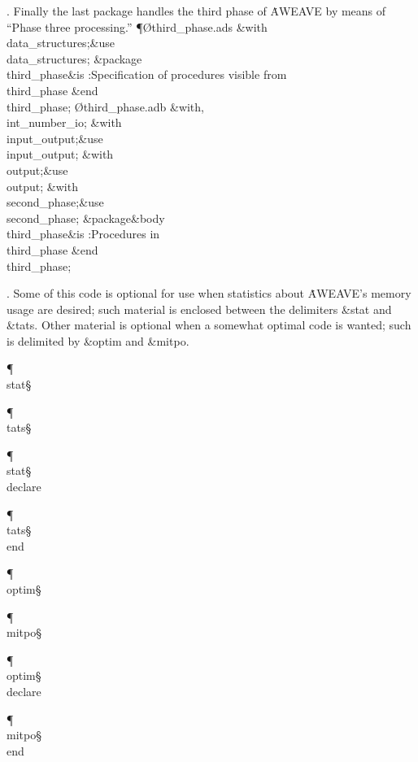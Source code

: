 \*. Finally the last package handles the third phase of \.{AWEAVE} by
means of ``Phase three processing.''
\Y\P\O{third\_phase.ads}\?\6
\?\&{with}\8\\{data\_structures};\8\&{use}\8\\{data\_structures};\6
\&{package}\8\1\\{third\_phase}\2\8\&{is}\8\1\6
:Specification of procedures visible from \\{third\_phase}\X\2\6
\&{end}\8\\{third\_phase};\7
\O{third\_phase.adb}\?\6
\?\&{with}\8\?,\?\\{int\_number\_io};\6
\&{with}\8\\{input\_output};\8\&{use}\8\\{input\_output};\6
\&{with}\8\\{output};\8\&{use}\8\\{output};\6
\&{with}\8\\{second\_phase};\8\&{use}\8\\{second\_phase};\6
\&{package}\8\1\&{body}\8\\{third\_phase}\2\8\&{is}\8\1\6
:Procedures in \\{third\_phase}\X\2\6
\&{end}\8\\{third\_phase};\par
\fi

. Some of this code is optional for use when
statistics about \.{AWEAVE}'s memory usage are desired;
such material is enclosed between the delimiters  \&{stat} and \&{tats}.
Other material is optional when a somewhat optimal code is wanted;
such is delimited by  \&{optim} and \&{mitpo}.

\Y\P\4\D\\{stat}\?\S\B{}\6
\?\par
\P\4\D\\{tats}\?\S\?\hbox{}\?\T{}\6
\?\par
\P\4\F\\{stat}\?\S\?\\{declare}\par
\P\4\F\\{tats}\?\S\?\\{end}\par
\P\4\D\\{optim}\?\S\B{}\6
\?\par
\P\4\D\\{mitpo}\?\S\?\hbox{}\?\T{}\6
\?\par
\P\4\F\\{optim}\?\S\?\\{declare}\par
\P\4\F\\{mitpo}\?\S\?\\{end}\par
\fi

